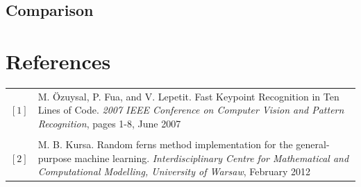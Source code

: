 \documentclass[twocolumn]{article}
\begin{document}
\subsection{Comparison}


\onecolumn
\section*{References}

\begin{tabular}{p{1cm}p{11cm}}

$[1]$ & M. \"Ozuysal, P. Fua, and V. Lepetit. Fast Keypoint Recognition in Ten Lines of Code. \textit{2007 IEEE Conference on Computer Vision and Pattern Recognition}, pages 1-8, June 2007\\
 & \\
$[2]$ & M. B. Kursa. Random ferns method implementation for the general-purpose machine learning. \textit{Interdisciplinary Centre for Mathematical and Computational Modelling, University of Warsaw}, February 2012

\end{tabular}
\end{document}
